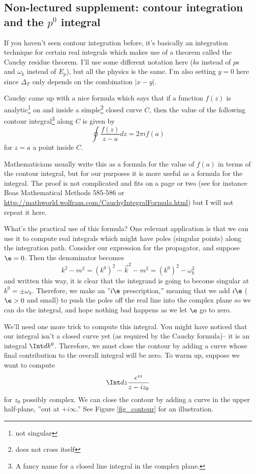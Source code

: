 \subsection*{Non-lectured supplement: contour integration and the $p^0$ integral}
If you haven't seen contour integration before, it's basically an integration technique for certain real integrals which makes use of a theorem called the Cauchy residue theorem. I'll use some different notation here ($k$s instead of $p$s and $\omega_k$ instead of $E_p$), but all the physics is the same. I'm also setting $y=0$ here since $\Delta_F$ only depends on the combination $|x-y|$.

Cauchy came up with a nice formula which says that if a function $f(z)$ is analytic\footnote{not singular} on and inside a simple\footnote{does not cross itself} closed curve $C$, then the value of the following contour integral\footnote{A fancy name for a closed line integral in the complex plane.} along $C$ is given by
$$\oint \frac{f(z)}{z-a}dz = 2\pi i f(a)$$
for $z=a$ a point inside $C$.

Mathematicians usually write this as a formula for the value of $f(a)$ in terms of the contour integral, but for our purposes it is more useful as a formula for the integral. The proof is not complicated and fits on a page or two (see for instance Boas Mathematical Methods 585-586 or \url{http://mathworld.wolfram.com/CauchyIntegralFormula.html}) but I will not repeat it here.

What's the practical use of this formula? One relevant application is that we can use it to compute real integrals which might have poles (singular points) along the integration path. Consider our expression for the propagator, and suppose $\e=0$. Then the denominator becomes $$k^2-m^2=(k^0)^2-\vec{k}^2-m^2=(k^0)^2- \omega_k^2$$
and written this way, it is clear that the integrand is going to become singular at $k^0=\pm \omega_k$. Therefore, we make an ''$i\e$ prescription,'' meaning that we add $i\e$ ($\e>0$ and small) to push the poles off the real line into the complex plane so we can do the integral, and hope nothing bad happens as we let $\e$ go to zero.

We'll need one more trick to compute this integral. You might have noticed that our integral isn't a closed curve yet (as required by the Cauchy formula)-- it is an integral $\Int dk^0$. Therefore, we must close the contour by adding a curve whose final contribution to the overall integral will be zero. To warm up, suppose we want to compute
$$\Int dz \frac{e^{iz}}{z-i z_0}$$
for $z_0$ possibly complex. We can close the contour by adding a curve in the upper half-plane, ''out at $+i\infty$.'' See Figure \ref{fig_contour} for an illustration. 

